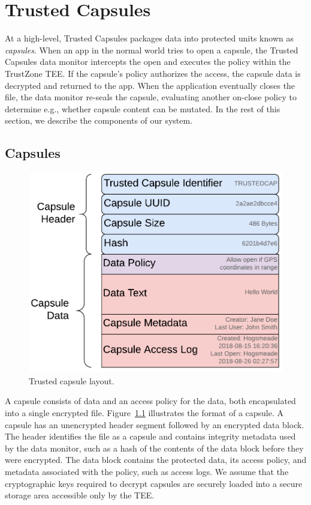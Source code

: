 \chapter{Trusted Capsules}
\label{ch:trustedcapsules}
At a high-level, Trusted Capsules packages data into protected units known as
    {\em capsules}. When an app in the normal world tries to open a capsule, the
Trusted Capsules data monitor intercepts the open and executes the policy within
the TrustZone TEE. If the capsule's policy authorizes the access, the capsule
data is decrypted and returned to the app. When the application eventually closes the file,
the data monitor re-seals the capsule, evaluating another on-close policy
to determine e.g., whether capsule content can be mutated. In the rest of this section,
we describe the components of our system.

\section{Capsules}

\begin{figure}
    \centering
    \includegraphics[width=\columnwidth]{fig/Fig2_Trusted_Capusle_Layout_New.pdf}
    \caption{Trusted capsule layout.}
    \label{fig:trustedcapsulelayout}
\end{figure}

A capsule consists of data and an access policy for the data, both encapsulated
into a single encrypted file. Figure~\ref{fig:trustedcapsulelayout} illustrates
the format of a capsule. A capsule has an unencrypted header segment followed by an
encrypted data block. The header identifies the file as a capsule and contains
integrity metadata used by the data monitor, such as a hash of the contents of
the data block before they were encrypted. The data block contains the protected
data, its access policy, and metadata associated with the policy, such as access
logs. We assume that the cryptographic keys required to decrypt capsules are
securely loaded into a secure storage area accessible only by the TEE.
%

